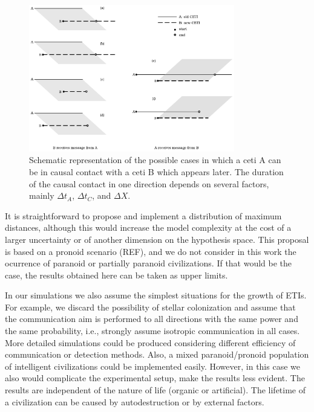 \documentclass[crop]{CSLB}%
\begin{document}
\begin{figure}
   \centering
   \includegraphics[width=0.8\textwidth]{Messages_01.pdf}
   \caption{Schematic representation of the possible cases in which a
   ceti A can be in causal contact with a ceti B which appears later.
   The duration of the causal contact in one direction depends on
   several factors, mainly $\Delta t_A$, $\Delta t_C$, and $\Delta X$.}
   \label{F_messages}
\end{figure}
                     



%
It is straightforward to propose and implement a distribution of
maximum distances, although this would increase the model complexity
at the cost of a larger uncertainty or of another dimension on the
hypothesis space.
%
This proposal is based on a pronoid scenario (REF), and we do not
consider in this work the ocurrence of paranoid or partially paranoid
civilizations.
%
If that would be the case, the results obtained here can be taken as
upper limits.



In our simulations we also assume the simplest situations for the
growth of ETIs.
%
For example, we discard the possibility of stellar colonization
\citep[e.g.][]{newman_galactic_1981, walters_interstellar_1980,
starling_virulence_2013, barlow_galactic_2012, jeong_large_2000, maccone_mathematical_2011}
and assume that the communication aim is performed to
all directions with the same power and the same probability, i.e.,
strongly assume isotropic communication in all cases.
%
More detailed simulations could be produced considering different 
efficiency of communication or detection methods.
%
Also, a mixed paranoid/pronoid population of intelligent civilizations
could be implemented easily.
%
However, in this case we also would complicate the experimental setup,
make the results less evident.
%
The results are independent of the nature of life (organic or
artificial).
%
The lifetime of a civilization can be caused by autodestruction or by
external factors.
\end{document}
